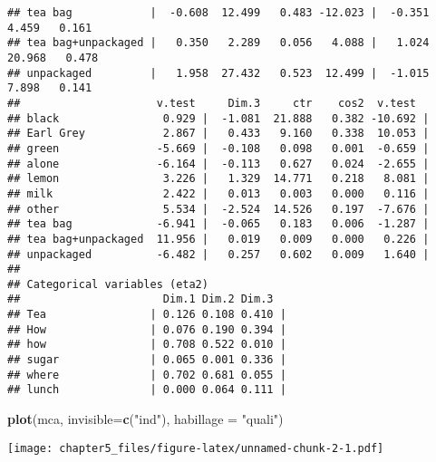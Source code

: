 \documentclass[]{article}
\newenvironment{Shaded}{\begin{snugshade}}{\end{snugshade}}
\newcommand{\DataTypeTok}[1]{\textcolor[rgb]{0.13,0.29,0.53}{#1}}
\newcommand{\KeywordTok}[1]{\textcolor[rgb]{0.13,0.29,0.53}{\textbf{#1}}}
\newcommand{\NormalTok}[1]{#1}
\newcommand{\StringTok}[1]{\textcolor[rgb]{0.31,0.60,0.02}{#1}}
\begin{document}
\begin{verbatim}
## tea bag            |  -0.608  12.499   0.483 -12.023 |  -0.351   4.459   0.161
## tea bag+unpackaged |   0.350   2.289   0.056   4.088 |   1.024  20.968   0.478
## unpackaged         |   1.958  27.432   0.523  12.499 |  -1.015   7.898   0.141
##                     v.test     Dim.3     ctr    cos2  v.test  
## black                0.929 |  -1.081  21.888   0.382 -10.692 |
## Earl Grey            2.867 |   0.433   9.160   0.338  10.053 |
## green               -5.669 |  -0.108   0.098   0.001  -0.659 |
## alone               -6.164 |  -0.113   0.627   0.024  -2.655 |
## lemon                3.226 |   1.329  14.771   0.218   8.081 |
## milk                 2.422 |   0.013   0.003   0.000   0.116 |
## other                5.534 |  -2.524  14.526   0.197  -7.676 |
## tea bag             -6.941 |  -0.065   0.183   0.006  -1.287 |
## tea bag+unpackaged  11.956 |   0.019   0.009   0.000   0.226 |
## unpackaged          -6.482 |   0.257   0.602   0.009   1.640 |
## 
## Categorical variables (eta2)
##                      Dim.1 Dim.2 Dim.3  
## Tea                | 0.126 0.108 0.410 |
## How                | 0.076 0.190 0.394 |
## how                | 0.708 0.522 0.010 |
## sugar              | 0.065 0.001 0.336 |
## where              | 0.702 0.681 0.055 |
## lunch              | 0.000 0.064 0.111 |
\end{verbatim}

\begin{Shaded}
\begin{Highlighting}[]
\KeywordTok{plot}\NormalTok{(mca, }\DataTypeTok{invisible=}\KeywordTok{c}\NormalTok{(}\StringTok{"ind"}\NormalTok{), }\DataTypeTok{habillage =} \StringTok{"quali"}\NormalTok{)}
\end{Highlighting}
\end{Shaded}

\texttt{[image: chapter5\_files/figure-latex/unnamed-chunk-2-1.pdf]}
\end{document}
